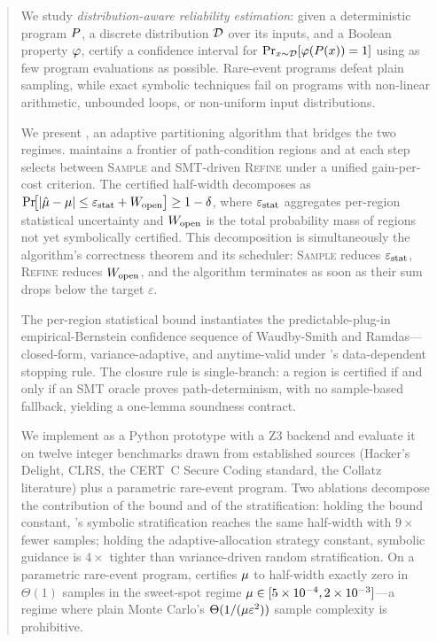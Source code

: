 \begin{abstract}
  We study \emph{distribution-aware reliability estimation}: given a
  deterministic program $\prog$, a discrete distribution $\dist$ over
  its inputs, and a Boolean property $\prop$, certify a confidence
  interval for $\Pr_{x \sim \dist}[\prop(\prog(x)) = 1]$ using as few
  program evaluations as possible.  Rare-event programs defeat plain
  sampling, while exact symbolic techniques fail on programs with
  non-linear arithmetic, unbounded loops, or non-uniform input
  distributions.

  We present \toolname{}, an adaptive partitioning algorithm that
  bridges the two regimes.  \toolname{} maintains a frontier of
  path-condition regions and at each step selects between
  \textsc{Sample} and SMT-driven \textsc{Refine} under a unified
  gain-per-cost criterion.  The certified half-width decomposes as
  $\Pr\!\bigl[|\muhat - \mutrue| \le \epsstat + \Wopen\bigr] \ge
  1 - \delta$, where $\epsstat$ aggregates per-region statistical
  uncertainty and $\Wopen$ is the total probability mass of regions
  not yet symbolically certified.  This decomposition is
  simultaneously the algorithm's correctness theorem and its
  scheduler: \textsc{Sample} reduces $\epsstat$, \textsc{Refine}
  reduces $\Wopen$, and the algorithm terminates as soon as their sum
  drops below the target $\varepsilon$.

  The per-region statistical bound instantiates the predictable-plug-in
  empirical-Bernstein confidence sequence of Waudby-Smith and
  Ramdas---closed-form, variance-adaptive, and anytime-valid under
  \toolname{}'s data-dependent stopping rule.  The closure rule is
  single-branch: a region is certified if and only if an SMT oracle
  proves path-determinism, with no sample-based fallback, yielding
  a one-lemma soundness contract.

  We implement \toolname{} as a Python prototype with a Z3 backend
  and evaluate it on twelve integer benchmarks drawn from established
  sources (Hacker's Delight, CLRS, the CERT~C Secure Coding standard,
  the Collatz literature) plus a parametric rare-event program.  Two
  ablations decompose the contribution of the bound and of the
  stratification: holding the bound constant, \toolname{}'s symbolic
  stratification reaches the same half-width with $9\times$ fewer
  samples; holding the adaptive-allocation strategy constant,
  symbolic guidance is $4\times$ tighter than variance-driven random
  stratification.  On a parametric rare-event program, \toolname{}
  certifies $\mutrue$ to half-width exactly zero in $\Theta(1)$
  samples in the sweet-spot regime $\mutrue \in [5\times 10^{-4},
  2\times 10^{-3}]$---a regime where plain Monte Carlo's
  $\Theta(1/(\mutrue\varepsilon^2))$ sample complexity is prohibitive.
\end{abstract}
